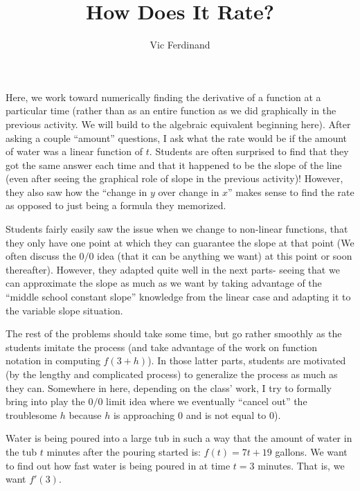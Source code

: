 \documentclass[handout]{ximera}
\author{Vic Ferdinand}
\title{How Does It Rate?}
\begin{document}
\begin{abstract}
\end{abstract}
\maketitle


\begin{instructorIntro}
Here, we work toward numerically finding the derivative of a function at a particular time (rather than as an entire function as we did graphically in the previous activity.  We will build to the algebraic equivalent beginning here).  After asking a couple ``amount'' questions, I ask what the rate would be if the amount of water was a linear function of $t$.  Students are often surprised to find that they got the same answer each time and that it happened to be the slope of the line (even after seeing the graphical role of slope in the previous activity)!  However, they also saw how the ``change in $y$ over change in $x$'' makes sense to find the rate as opposed to just being a formula they memorized.

Students fairly easily saw the issue when we change to non-linear functions, that they only have one point at which they can guarantee the slope at that point (We often discuss the $0/0$ idea (that it can be anything we want) at this point or soon thereafter).  However, they adapted quite well in the next parts- seeing that we can approximate the slope as much as we want by taking advantage of the ``middle school constant slope'' knowledge from the linear case and adapting it to the variable slope situation.

The rest of the problems should take some time, but go rather smoothly as the students imitate the process (and take advantage of the work on function notation in computing $f(3 + h)$).  In those latter parts, students are motivated (by the lengthy and complicated process) to generalize the process as much as they can.  Somewhere in here, depending on the class' work, I try to formally bring into play the $0/0$ limit idea where we eventually ``cancel out'' the troublesome $h$ because $h$ is approaching $0$ and is not equal to $0$).

\end{instructorIntro}


Water is being poured into a large tub in such a way that the amount of water in the tub $t$ minutes after the pouring started is: $f(t) = 7t+19$  gallons.  We want to find out how fast water is being poured in at time $t = 3$ minutes.  That is, we want  $f'(3)$.
\end{document}
